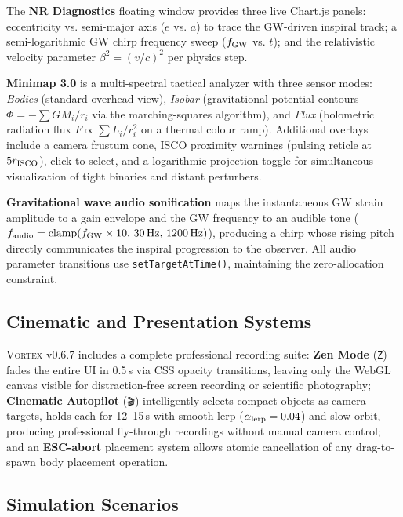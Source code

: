 \documentclass[aps,prd,twocolumn,superscriptaddress,nofootinbib,showpacs,
               longbibliography]{revtex4-2}
\newcommand{\code}[1]{\texttt{#1}}
\begin{document}
The \textbf{NR Diagnostics} floating window provides three live
Chart.js panels: eccentricity vs. semi-major axis ($e$ vs. $a$) to
trace the GW-driven inspiral track; a semi-logarithmic GW chirp
frequency sweep ($f_{\rm GW}$ vs. $t$); and the relativistic velocity
parameter $\beta^2 = (v/c)^2$ per physics step.

\textbf{Minimap 3.0} is a multi-spectral tactical analyzer with three
sensor modes: \emph{Bodies} (standard overhead view), \emph{Isobar}
(gravitational potential contours $\Phi = -\sum GM_i/r_i$ via the
marching-squares algorithm), and \emph{Flux} (bolometric radiation flux
$F \propto \sum L_i/r_i^2$ on a thermal colour ramp).
Additional overlays include a camera frustum cone, ISCO proximity
warnings (pulsing reticle at $5r_{\rm ISCO}$), click-to-select,
and a logarithmic projection toggle for simultaneous visualization of
tight binaries and distant perturbers.

\textbf{Gravitational wave audio sonification}
maps the instantaneous GW strain amplitude to a gain envelope and the
GW frequency to an audible tone ($f_{\rm audio} = \text{clamp}(f_{\rm GW}\times 10,\,30\text{\,Hz},\,1200\text{\,Hz})$),
producing a chirp whose rising pitch directly communicates the inspiral
progression to the observer.
All audio parameter transitions use \code{setTargetAtTime()}, maintaining
the zero-allocation constraint.

\subsection{Cinematic and Presentation Systems}
\label{sec:vortex_cinematic}

\textsc{Vortex} v0.6.7 includes a complete professional recording suite:
\textbf{Zen Mode} (\code{Z}) fades the entire UI in 0.5\,s via CSS
opacity transitions, leaving only the WebGL canvas visible for
distraction-free screen recording or scientific photography;
\textbf{Cinematic Autopilot} (\code{🎬}) intelligently selects compact
objects as camera targets, holds each for 12--15\,s with smooth lerp
($\alpha_{\rm lerp} = 0.04$) and slow orbit, producing professional
fly-through recordings without manual camera control;
and an \textbf{ESC-abort} placement system allows atomic cancellation of
any drag-to-spawn body placement operation.

\subsection{Simulation Scenarios}
\label{sec:vortex_scenarios}
\end{document}
